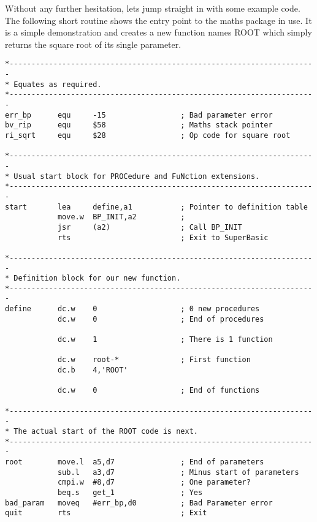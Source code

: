 Without any further hesitation, lets jump straight in with some
    example code. The following short routine shows the  entry point to
    the maths package in use. It is a simple demonstration and creates a new
    function names ROOT which simply returns the square root of its single
    parameter.

\begin{lstlisting}[firstnumber=1,caption={The Maths Package - Calculate Square Roots},label={lst:MathsPackageRoot}]
*----------------------------------------------------------------------
* Equates as required.
*----------------------------------------------------------------------
err_bp      equ     -15                 ; Bad parameter error
bv_rip      equ     $58                 ; Maths stack pointer
ri_sqrt     equ     $28                 ; Op code for square root

*----------------------------------------------------------------------
* Usual start block for PROCedure and FuNction extensions.
*----------------------------------------------------------------------
start       lea     define,a1           ; Pointer to definition table
            move.w  BP_INIT,a2          ; 
            jsr     (a2)                ; Call BP_INIT
            rts                         ; Exit to SuperBasic

*----------------------------------------------------------------------
* Definition block for our new function.
*----------------------------------------------------------------------
define      dc.w    0                   ; 0 new procedures
            dc.w    0                   ; End of procedures

            dc.w    1                   ; There is 1 function

            dc.w    root-*              ; First function
            dc.b    4,'ROOT'

            dc.w    0                   ; End of functions

*----------------------------------------------------------------------
* The actual start of the ROOT code is next.
*----------------------------------------------------------------------
root        move.l  a5,d7               ; End of parameters
            sub.l   a3,d7               ; Minus start of parameters
            cmpi.w  #8,d7               ; One parameter?
            beq.s   get_1               ; Yes
bad_param   moveq   #err_bp,d0          ; Bad Parameter error
quit        rts                         ; Exit


\end{lstlisting}
